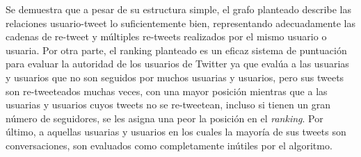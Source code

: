 Se demuestra que a pesar de su estructura simple, el grafo planteado describe las relaciones usuario-tweet lo suficientemente bien, representando adecuadamente las cadenas de re-tweet y múltiples re-tweets realizados por el mismo usuario o usuaria. Por otra parte, el ranking planteado es un eficaz sistema de puntuación para evaluar la autoridad de los usuarios de Twitter ya que evalúa a las usuarias y usuarios que no son seguidos por muchos usuarias y usuarios, pero sus tweets son re-tweeteados muchas veces, con una mayor posición mientras que a las usuarias y usuarios cuyos tweets no se re-tweetean, incluso si tienen un gran número de seguidores, se les asigna una peor la posición en el \emph{ranking}. Por último, a aquellas usuarias y usuarios en los cuales la mayoría de sus tweets son conversaciones, son evaluados como completamente inútiles por el algoritmo. 
